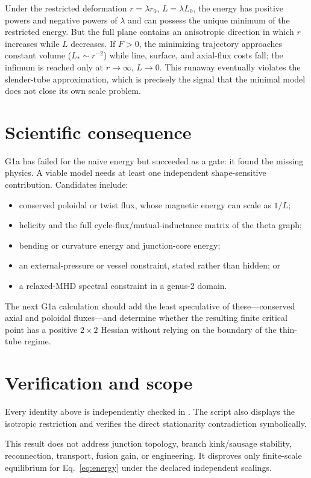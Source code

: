 \documentclass[11pt]{article}
\begin{document}
Under the restricted deformation $r=\lambda r_0$, $L=\lambda L_0$, the energy has
positive powers and negative powers of $\lambda$ and can possess the unique minimum
of the restricted energy. But the full plane contains an anisotropic direction in which $r$
increases while $L$ decreases. If $F>0$, the minimizing trajectory approaches
constant volume ($L_*\sim r^{-2}$) while line, surface, and axial-flux costs fall;
the infimum is reached only at $r\to\infty$, $L\to0$. This runaway eventually
violates the slender-tube approximation, which is precisely the signal that the
minimal model does not close its own scale problem.

\section{Scientific consequence}

G1a has failed for the naive energy but succeeded as a gate: it found the missing
physics. A viable model needs at least one independent shape-sensitive contribution.
Candidates include:
\begin{itemize}
\item conserved poloidal or twist flux, whose magnetic energy can scale as $1/L$;
\item helicity and the full cycle-flux/mutual-inductance matrix of the theta graph;
\item bending or curvature energy and junction-core energy;
\item an external-pressure or vessel constraint, stated rather than hidden; or
\item a relaxed-MHD spectral constraint in a genus-2 domain.
\end{itemize}

The next G1a calculation should add the least speculative of these---conserved axial
and poloidal fluxes---and determine whether the resulting finite critical point has a
positive $2\times2$ Hessian without relying on the boundary of the thin-tube regime.

\section{Verification and scope}

Every identity above is independently checked in
. The script also displays the isotropic
restriction and verifies the direct stationarity contradiction symbolically.

This result does not address junction topology, branch kink/sausage stability,
reconnection, transport, fusion gain, or engineering. It disproves only finite-scale
equilibrium for Eq.~\eqref{eq:energy} under the declared independent scalings.
\end{document}
